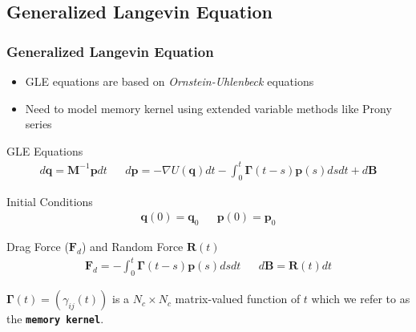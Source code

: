 \documentclass[a4paper,10pt]{beamer}
\newcommand{\BS}[1]{\boldsymbol{#1}}
\begin{document}
	\begin{frame}
		\footnotesize
		\section{Generalized Langevin Equation}
		\frametitle{Generalized Langevin Equation}
		\begin{itemize}
			\item {GLE equations are based on \textit{Ornstein-Uhlenbeck} equations}
			\item {Need to model memory kernel using extended variable methods like Prony series}
		\end{itemize}
	
		\begin{block}{GLE Equations}
			\begin{align}
			d\BS{q} = \BS{M}^{-1} \BS{p} dt &&
			d\BS{p} = -\nabla U(\BS{q}) dt - \int_{0}^{t} \BS{\Gamma}(t-s) \BS{p}(s) ds dt + d\BS{B}
			\end{align}
		\end{block}
		
		\begin{block}{Initial Conditions}
			\begin{align}\BS{q}(0) = \BS{q}_{0} && \BS{p}(0) = \BS{p}_{0}\end{align}
		\end{block}
	
		\begin{block}{Drag Force ($\BS{F}_{d}$) and Random Force $\BS{R}(t)$}
			\begin{align}
			\BS{F}_d = - \int_{0}^{t} \BS{\Gamma}(t-s) \BS{p}(s) ds dt && d \BS{B} = \BS{R}(t)dt
			\end{align}
		\end{block}
		$\BS{\Gamma}(t) = (\gamma_{ij}(t))$ is a $N_c \times N_c$ matrix-valued function of $t$ which we refer to as the \textbf{\texttt{memory kernel}}.
	\end{frame}
\end{document}
